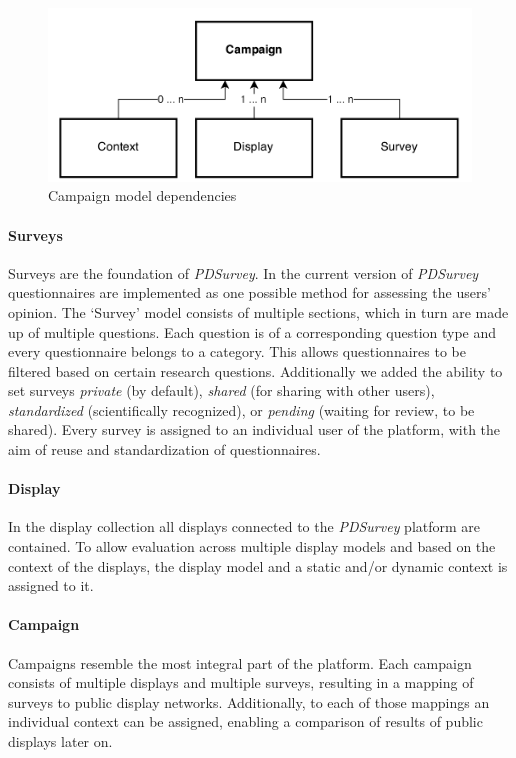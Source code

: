 \begin{figure}[bph]
    \begin{center}
        \includegraphics[width=.8\columnwidth]{img/4_implementation/4-dependency-campaign}
    \end{center}
 \caption{Campaign model dependencies}
 \label{fig:4-dependency-campaign}
\end{figure}


	\paragraph{Surveys} Surveys are the foundation of \textit{PDSurvey}. In the current version of \textit{PDSurvey} questionnaires are implemented as one possible method for assessing the users' opinion. The `Survey' model consists of multiple sections, which in turn are made up of multiple questions. Each question is of a corresponding question type and every questionnaire belongs to a category. This allows questionnaires to be filtered based on certain research questions. Additionally we added the ability to set surveys \textit{private} (by default), \textit{shared} (for sharing with other users), \textit{standardized} (scientifically recognized), or \textit{pending} (waiting for review, to be shared). Every survey is assigned to an individual user of the platform, with the aim of reuse and standardization of questionnaires.

	\paragraph{Display} In the display collection all displays connected to the \textit{PDSurvey} platform are contained. To allow evaluation across multiple display models and based on the context of the displays, the display model and a static and/or dynamic context is assigned to it.

	\paragraph{Campaign} Campaigns resemble the most integral part of the platform. Each campaign consists of multiple displays and multiple surveys, resulting in a mapping of  surveys to public display networks. Additionally, to each of those mappings an individual context can be assigned, enabling a comparison of results of public displays later on.

